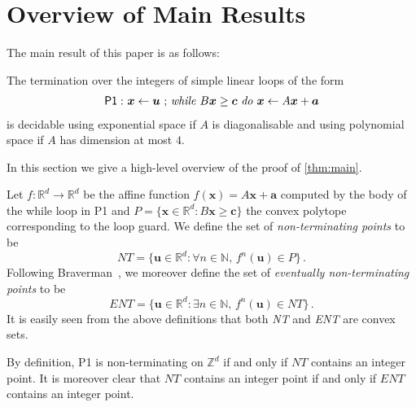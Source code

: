 \section{Overview of Main Results}
\label{sec:overview}
The main result of this paper is as follows:
\begin{theorem}
  The termination over the integers of simple linear loops of the form
\begin{gather*}
\mathsf{P1:}\  \mbox{$\boldsymbol{x}\gets \boldsymbol{u}$ ;
\textit{while} $B\boldsymbol{x} \geq \boldsymbol{c}$ \textit{do}
$\boldsymbol{x}\leftarrow A\boldsymbol{x}+\boldsymbol{a}$}
\end{gather*}
is decidable using exponential space if $A$ is diagonalisable and
using polynomial space if $A$ has dimension at most $4$.
\label{thm:main}
\end{theorem}
In this section we give a high-level overview of the proof of \cref{thm:main}.

Let $f:\mathbb{R}^d\rightarrow \mathbb{R}^d$ be the affine function
$f(\boldsymbol{x})=A\boldsymbol{x}+\boldsymbol a$ computed by the body
of the while loop in \textsf{P1} and $P=\{ \boldsymbol{x} \in
\mathbb{R}^d: B \boldsymbol{x}\geq \boldsymbol{c}\}$ the convex polytope
corresponding to the loop guard.  We define the set of
\emph{non-terminating points} to be
\[ \mathit{NT} = \{ \boldsymbol{u}\in \mathbb{R}^d : \forall n \in
\mathbb{N},\, f^n(\boldsymbol{u}) \in P \} \, .\] Following
Braverman~\cite{Bra06}, we moreover define the set of \emph{eventually
  non-terminating points} to be
\[ \mathit{ENT} = \{ \boldsymbol{u}\in \mathbb{R}^d : \exists n \in
\mathbb{N},\, f^n(\boldsymbol{u}) \in \mathit{NT} \} \, .\]
It is easily seen from the above definitions that both \textit{NT} and
\textit{ENT} are convex sets.

By definition, \textsf{P1} is non-terminating on $\mathbb{Z}^d$ if
and only if $\mathit{NT}$ contains an integer point.  It is moreover
clear that $\mathit{NT}$ contains an integer point if and only if
$\mathit{ENT}$ contains an integer point.


